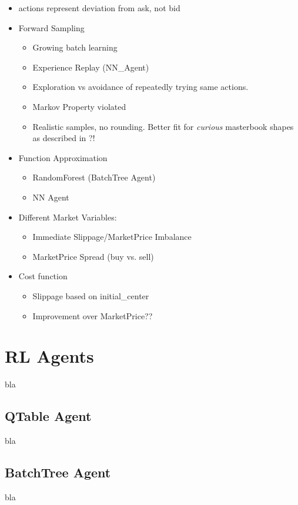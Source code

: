 \begin{itemize}
\item actions represent deviation from ask, not bid
\item Forward Sampling
\begin{itemize}
\item Growing batch learning
\item Experience Replay (NN\_Agent)
\item Exploration vs avoidance of repeatedly trying same actions.
\end{itemize}
\begin{itemize}
\item Markov Property violated
\item Realistic samples, no rounding. Better fit for \emph{curious} masterbook shapes as described in ?!
\end{itemize}
\item Function Approximation
\begin{itemize}
\item RandomForest (BatchTree Agent)
\item NN Agent
\end{itemize}
\item Different Market Variables:
\begin{itemize}
\item Immediate Slippage/MarketPrice Imbalance
\item MarketPrice Spread (buy vs. sell)
\end{itemize}
\item Cost function
\begin{itemize}
\item Slippage based on initial\_center
\item Improvement over MarketPrice??
\end{itemize}
\end{itemize}


\section{RL Agents}
bla

\subsection{QTable Agent}
bla

\subsection{BatchTree Agent}
bla

